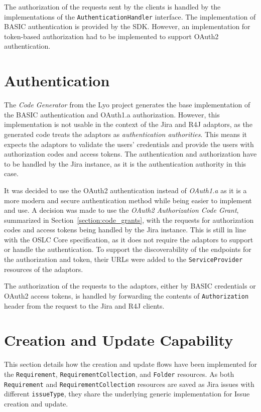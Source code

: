The authorization of the requests sent by the clients is handled by the implementations of the \texttt{AuthenticationHandler} interface. The implementation of BASIC authentication is provided by the SDK. However, an implementation for token-based authorization had to be implemented to support OAuth2 authentication.

\section{Authentication}
The \emph{Code Generator} from the Lyo project generates the base implementation of the BASIC authentication and OAuth1.a authorization. However, this implementation is not usable in the context of the Jira and R4J adaptors, as the generated code treats the adaptors as \emph{authentication authorities}. This means it expects the adaptors to validate the users' credentials and provide the users with authorization codes and access tokens. The authentication and authorization have to be handled by the Jira instance, as it is the authentication authority in this case.

It was decided to use the OAuth2 authentication instead of \emph{OAuth1.a} as it is a more modern and secure authentication method while being easier to implement and use. A decision was made to use the \emph{OAuth2 Authorization Code Grant}, summarized in Section \ref{section:code_grants}, with the requests for authorization codes and access tokens being handled by the Jira instance. This is still in line with the OSLC Core specification, as it does not require the adaptors to support or handle the authentication. To support the discoverability of the endpoints for the authorization and token, their URLs were added to the \texttt{ServiceProvider} resources of the adaptors.

The authorization of the requests to the adaptors, either by BASIC credentials or OAuth2 access tokens, is handled by forwarding the contents of \texttt{Authorization} header from the request to the Jira and R4J clients.

\section{Creation and Update Capability}
This section details how the creation and update flows have been implemented for the \texttt{Requirement}, \texttt{RequirementCollection}, and \texttt{Folder} resources. As both \texttt{Requirement} and \texttt{RequirementCollection} resources are saved as Jira issues with different \texttt{issueType}, they share the underlying generic implementation for Issue creation and update.


